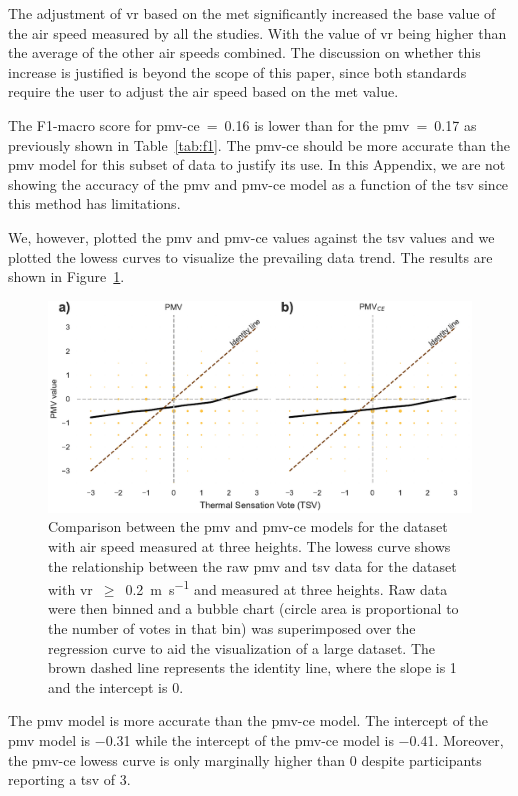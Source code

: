 The adjustment of \ac{vr} based on the \ac{met} significantly increased the base value of the air speed measured by all the studies.
With the value of \ac{vr} being  higher than the average of the other air speeds combined.
The discussion on whether this increase is justified is beyond the scope of this paper, since both standards require the user to adjust the air speed based on the \ac{met} value.

The F1-macro score for \ac{pmv-ce}~=~\num{.16} is lower than for the \ac{pmv}~=~\num{.17} as previously shown in Table~\ref{tab:f1}.
The \ac{pmv-ce} should be more accurate than the \ac{pmv} model for this subset of data to justify its use.
In this Appendix, we are not showing the accuracy of the \ac{pmv} and \ac{pmv-ce} model as a function of the \ac{tsv} since this method has limitations.

We, however, plotted the \ac{pmv} and \ac{pmv-ce} values against the \ac{tsv} values and we plotted the \ac{lowess} curves to visualize the prevailing data trend.
The results are shown in Figure~\ref{fig:bubble_models_vs_tsv_three_heights}.
\begin{figure}[htb!]
    \centering
    \includegraphics[width=\textwidth]{figures/bubble_models_vs_tsv_three_heights}
    \caption{Comparison between the \ac{pmv} and \ac{pmv-ce} models for the dataset with air speed measured at three heights. 
    The \ac{lowess} curve shows the relationship between the raw \ac{pmv} and \ac{tsv} data for the dataset with \ac{vr}~$\geq$~\qty{0.2}{\m\per\s} and measured at three heights.
    Raw data were then binned and a bubble chart (circle area is proportional to the number of votes in that bin) was superimposed over the regression curve to aid the visualization of a large dataset.
    The brown dashed line represents the identity line, where the slope is 1 and the intercept is 0.}
    \label{fig:bubble_models_vs_tsv_three_heights}
\end{figure}
The \ac{pmv} model is more accurate than the \ac{pmv-ce} model.
The intercept of the \ac{pmv} model is \num{-.31} while the intercept of the \ac{pmv-ce} model is \num{-.41}.
Moreover, the \ac{pmv-ce} \ac{lowess} curve is only marginally higher than \num{0} despite participants reporting a \ac{tsv} of \num{3}.

